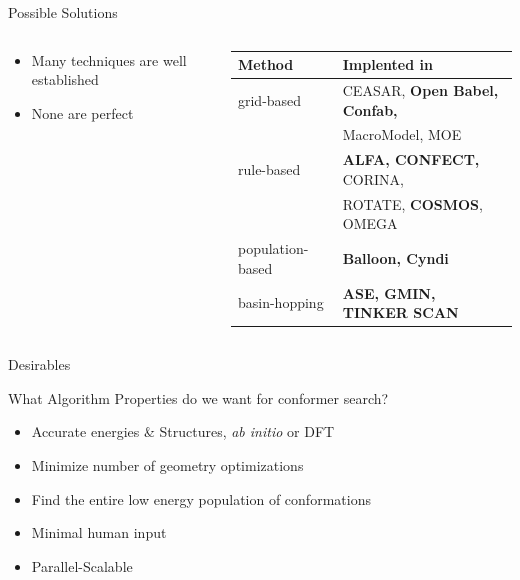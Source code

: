 \documentclass[10pt]{beamer}
\begin{document}
{%
\begin{frame}[fragile]{Possible Solutions}
	\begin{columns}[c] %
		\begin{column}{.4\textwidth}
			\begin{itemize}[<+->]
				\item {Many techniques are well established}
				\item {None are perfect}
			\end{itemize}
		\end{column}
		\hfill
		\begin{column}{.65\textwidth}
			\footnotesize
			\begin{tabular}{ l  l}
				Method & Implented in 
				\\ \midrule	
				grid-based & CEASAR, \textbf{Open Babel, Confab,} \\ 
				           & MacroModel, MOE  \\
				rule-based & \textbf{ALFA, CONFECT,} CORINA, \\
				           & ROTATE, \textbf{COSMOS}, OMEGA \\
				population-based & \textbf{Balloon, Cyndi} \\ 
				basin-hopping & \textbf{ASE, GMIN, TINKER SCAN} \\ 		
			\end{tabular}
		\end{column}
	\end{columns}		
\end{frame}
}

\begin{frame}{Desirables}
	\begin{block}{What Algorithm Properties do we want for conformer search?}
		\begin{itemize}[<+->]
			\item[1.] Accurate energies \& Structures, \emph{ab initio} or DFT
			\item[2.] {Minimize number of geometry optimizations}
			\item[3.] {Find the entire low energy population of conformations}
			\item[4.] {Minimal human input}
			\item[5.] {Parallel-Scalable}
		\end{itemize}
	\end{block}	
\end{frame}
\end{document}
